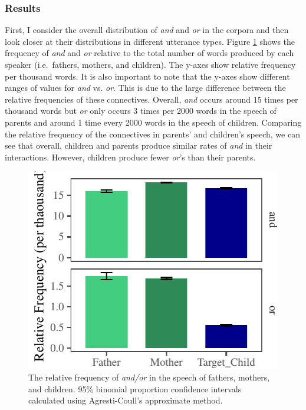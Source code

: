 \documentclass[floatsintext,man]{apa6}
\theoremstyle{definition}
\theoremstyle{definition}
\theoremstyle{definition}
\theoremstyle{remark}
\begin{document}
\subsubsection{Results}\label{study1results}

First, I consider the overall distribution of \emph{and} and \emph{or}
in the corpora and then look closer at their distributions in different
utterance types. Figure \ref{fig:freqTableBySpeakerPlot} shows the
frequency of \emph{and} and \emph{or} relative to the total number of
words produced by each speaker (i.e.~fathers, mothers, and children).
The y-axes show relative frequency per thousand words. It is also
important to note that the y-axes show different ranges of values for
\emph{and} vs. \emph{or}. This is due to the large difference between
the relative frequencies of these connectives. Overall, \emph{and}
occurs around 15 times per thousand words but \emph{or} only occurs 3
times per 2000 words in the speech of parents and around 1 time every
2000 words in the speech of children. Comparing the relative frequency
of the connectives in parents' and children's speech, we can see that
overall, children and parents produce similar rates of \emph{and} in
their interactions. However, children produce fewer \emph{or}'s than
their parents.

\begin{figure}[tb]

{\centering \includegraphics{figs/freqTableBySpeakerPlot-1} 

}

\caption{The relative frequency of \textit{and/or} in the speech of fathers, mothers, and children. 95\% binomial proportion confidence intervals calculated using Agresti-Coull's approximate method.}\label{fig:freqTableBySpeakerPlot}
\end{figure}
\end{document}
